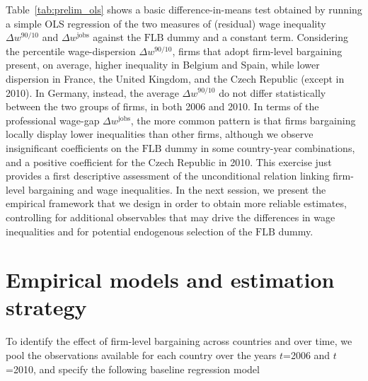 \documentclass[12pt]{article}
\begin{document}
Table~\ref{tab:prelim_ols} shows a basic difference-in-means test
obtained by running a simple OLS regression of the two measures of
(residual) wage inequality $\Delta w^{90/10}$ and $\Delta
w^\mathrm{jobs}$ against the $\mathrm{FLB}$ dummy and a constant term.
Considering the percentile wage-dispersion $\Delta w^{90/10}$, firms
that adopt firm-level bargaining present, on average, higher
inequality in Belgium and Spain, while lower dispersion in France, the
United Kingdom, and the Czech Republic (except in 2010). In Germany,
instead, the average $\Delta w^{90/10}$ do not differ statistically
between the two groups of firms, in both 2006 and 2010. In terms of
the professional wage-gap $\Delta w^\mathrm{jobs}$, the more common
pattern is that firms bargaining locally display lower inequalities
than other firms, although we observe insignificant coefficients on
the $\mathrm{FLB}$ dummy in some country-year combinations, and a
positive coefficient for the Czech Republic in 2010. This exercise
just provides a first descriptive assessment of the unconditional
relation linking firm-level bargaining and wage inequalities. In the
next session, we present the empirical framework that we design in
order to obtain more reliable estimates, controlling for additional
observables that may drive the differences in wage inequalities and
for potential endogenous selection of the $\mathrm{FLB}$ dummy.




\section{Empirical models and estimation strategy}
\label{sec:empirical}


To identify the effect of firm-level bargaining across countries and
over time, we pool the observations available for each country over
the years $t$=2006 and $t$=2010, and specify the following baseline
regression model
\end{document}
